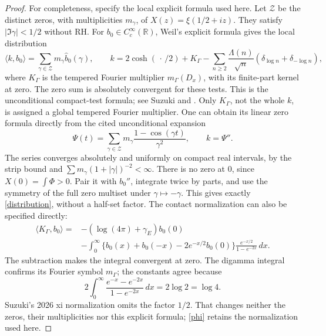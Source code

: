 \documentclass[11pt]{article}
\theoremstyle{remark}
\newcommand{\dd}{\,d}
\newcommand{\R}{\mathbb R}
\begin{document}
\begin{proof}
For completeness, specify the local explicit formula used here.
Let \(\mathcal Z\) be the distinct zeros, with multiplicities
\(m_\gamma\), of \(X(z)=\xi(1/2+iz)\).
They satisfy \(|\Im\gamma|<1/2\) without RH.
For \(b_0\in C_c^\infty(\R)\), Weil's explicit formula gives the
local distribution
\begin{equation}\label{distribution}
 \langle k,b_0\rangle
     =\sum_{\gamma\in\mathcal Z}m_\gamma\widehat b_0(\gamma),
 \qquad
 k=2\cosh(\,\cdot\,/2)+K_\Gamma
       -\sum_{n\ge2}\frac{\Lambda(n)}{\sqrt n}
                (\delta_{\log n}+\delta_{-\log n}),
\end{equation}
where \(K_\Gamma\) is the tempered Fourier multiplier
\(m_\Gamma(D_x)\), with its finite-part kernel at zero.
The zero sum is absolutely convergent for these tests.
This is the unconditional compact-test formula; see
Suzuki \cite[Theorem~1.1(2), (1.3)]{SuzukiScrew} and
\cite[Sections~2.4--2.5; (3.1), printed p.~13]{SuzukiWeil}.
Only \(K_\Gamma\), not the whole \(k\), is assigned a global
tempered Fourier multiplier.
One can obtain its linear zero formula directly from the cited
unconditional expansion
\[
 \Psi(t)=\sum_{\gamma\in\mathcal Z}m_\gamma
                   \frac{1-\cos(\gamma t)}{\gamma^2},
                       \qquad k=\Psi''.
\]
The series converges absolutely and uniformly on compact real
intervals, by the strip bound and
\(\sum m_\gamma(1+|\gamma|)^{-2}<\infty\).
There is no zero at \(0\), since \(X(0)=\int\Phi>0\).
Pair it with \(b_0''\), integrate twice by parts, and use the
symmetry of the full zero multiset under \(\gamma\mapsto-\gamma\).
This gives exactly \eqref{distribution}, without a half-set factor.
The contact normalization can also be specified directly:
\begin{align*}
 \langle K_\Gamma,b_0\rangle
 ={}&-(\log(4\pi)+\gamma_E)b_0(0)\\
 &-\int_0^\infty
   \{b_0(x)+b_0(-x)-2e^{-x/2}b_0(0)\}
               \frac{e^{-x/2}}{1-e^{-2x}}\dd x .
\end{align*}
The subtraction makes the integral convergent at zero.
The digamma integral confirms its Fourier symbol \(m_\Gamma\);
the constants agree because
\[
 2\int_0^\infty\frac{e^{-x}-e^{-2x}}{1-e^{-2x}}\dd x
       =2\log2=\log4.
\]
Suzuki's 2026 xi normalization omits the factor \(1/2\).
That changes neither the zeros, their multiplicities nor this
explicit formula; \eqref{phi} retains the normalization used here.


\end{proof}
\end{document}
